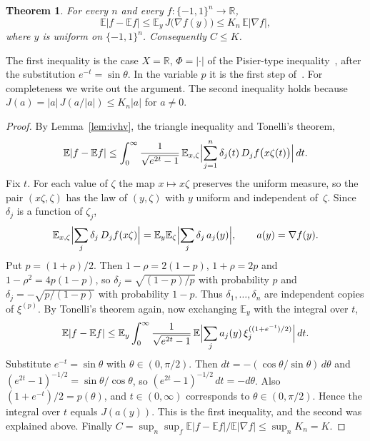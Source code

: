 \documentclass[11pt]{amsart}
\newtheorem{theorem}{Theorem}[section]
\theoremstyle{remark}
\numberwithin{equation}{section}
\newcommand{\R}{\mathbb{R}}
\newcommand{\E}{\mathbb{E}}
\begin{document}
\begin{theorem}\label{thm:reduction}
For every $n$ and every $f\colon\{-1,1\}^n\to\R$,
\[
\E|f-\E f|\le\E_y\,J\bigl(\nabla f(y)\bigr)\le K_n\,\E|\nabla f|,
\]
where $y$ is uniform on $\{-1,1\}^n$. Consequently $C\le K$.
\end{theorem}

The first inequality is the case $X=\R$, $\Phi=|\cdot|$ of the Pisier-type inequality~\cite[Theorem~1.2]{IvHV}, after the substitution $e^{-t}=\sin\theta$. In the variable $p$ it is the first step of~\cite[Section~2.4]{IS24}. For completeness we write out the argument. The second inequality holds because $J(a)=|a|\,J(a/|a|)\le K_n|a|$ for $a\ne0$.

\begin{proof}
By Lemma~\ref{lem:ivhv}, the triangle inequality and Tonelli's theorem,
\[
\E|f-\E f|\le\int_0^\infty\frac{1}{\sqrt{e^{2t}-1}}\,\E_{x,\zeta}\Bigl|\sum_{j=1}^n\delta_j(t)\,D_jf\bigl(x\zeta(t)\bigr)\Bigr|\,dt.
\]
Fix $t$. For each value of $\zeta$ the map $x\mapsto x\zeta$ preserves the uniform measure, so the pair $(x\zeta,\zeta)$ has the law of $(y,\zeta)$ with $y$ uniform and independent of~$\zeta$. Since $\delta_j$ is a function of $\zeta_j$,
\[
\E_{x,\zeta}\Bigl|\sum_j\delta_j\,D_jf(x\zeta)\Bigr|=\E_y\E_\zeta\Bigl|\sum_j\delta_j\,a_j(y)\Bigr|,\qquad a(y)=\nabla f(y).
\]
Put $p=(1+\rho)/2$. Then $1-\rho=2(1-p)$, $1+\rho=2p$ and $1-\rho^2=4p(1-p)$, so $\delta_j=\sqrt{(1-p)/p}$ with probability $p$ and $\delta_j=-\sqrt{p/(1-p)}$ with probability $1-p$. Thus $\delta_1,\dots,\delta_n$ are independent copies of $\xi^{(p)}$. By Tonelli's theorem again, now exchanging $\E_y$ with the integral over $t$,
\[
\E|f-\E f|\le\E_y\int_0^\infty\frac{1}{\sqrt{e^{2t}-1}}\,\E\Bigl|\sum_ja_j(y)\,\xi_j^{((1+e^{-t})/2)}\Bigr|\,dt.
\]
Substitute $e^{-t}=\sin\theta$ with $\theta\in(0,\pi/2)$. Then $dt=-(\cos\theta/\sin\theta)\,d\theta$ and $(e^{2t}-1)^{-1/2}=\sin\theta/\cos\theta$, so $(e^{2t}-1)^{-1/2}\,dt=-d\theta$. Also $(1+e^{-t})/2=p(\theta)$, and $t\in(0,\infty)$ corresponds to $\theta\in(0,\pi/2)$. Hence the integral over $t$ equals $J(a(y))$. This is the first inequality, and the second was explained above. Finally $C=\sup_n\sup_f\E|f-\E f|/\E|\nabla f|\le\sup_nK_n=K$.
\end{proof}
\end{document}
